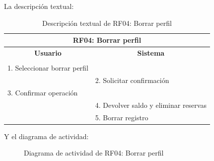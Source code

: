 \begin{itemize}
	La descripción textual:
	\begin{table}[h]
		\centering	
		\begin{tabular}{|l|l|}
			\hline
			\multicolumn{2}{|c|}{\textbf{RF04: Borrar perfil}} \\ \hline
			\multicolumn{1}{|c|}{\textbf{Usuario}} & \multicolumn{1}{c|}{\textbf{Sistema}} \\ \hline
			[Pto. inclusión: RF02: Loguear usuario] &\\ \hline
			1. Seleccionar borrar perfil &\\ \hline
			& 2. Solicitar confirmación\\ \hline
			3. Confirmar operación &\\ \hline
			& 4. Devolver saldo y eliminar reservas \\ \hline
			& 5. Borrar registro \\ \hline
		\end{tabular}
		\caption{Descripción textual de RF04: Borrar perfil}
		\label{tab:tablaDescTextualRF04}
	\end{table}
	
	Y el diagrama de actividad:
	\begin{figure}[!htb]
		\centering
		\caption{Diagrama de actividad de RF04: Borrar perfil}
		\label{fig:diagramaActividad_RF04}
	\end{figure}
	

\end{itemize}
